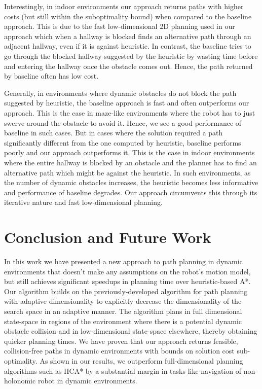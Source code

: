 Interestingly, in indoor environments our approach returns paths with higher costs (but still within the suboptimality bound) when compared to the baseline approach. This is due to the fast low-dimensional 2D planning used in our approach which when a hallway is blocked finds an alternative path through an adjacent hallway, even if it is against heuristic. In contrast, the baseline tries to go through the blocked hallway suggested by the heuristic by wasting time before and entering the hallway once the obstacle comes out. Hence, the path returned by baseline often has low cost.

Generally, in environments where dynamic obstacles do not block the path suggested by heuristic, the baseline approach is fast and often outperforms our approach. This is the case in maze-like environments where the robot has to just swerve around the obstacle to avoid it. Hence, we see a good performance of baseline in such cases. But in cases where the solution required a path significantly different from the one computed by heuristic, baseline performs poorly and our approach outperforms it. This is the case in indoor environments where the entire hallway is blocked by an obstacle and the planner has to find an alternative path which might be against the heuristic. In such environments, as the number of dynamic obstacles increases, the heuristic becomes less informative and performance of baseline degrades. Our approach circumvents this through its iterative nature and fast low-dimensional planning.

\section{Conclusion and Future Work}\label{sec:conclusion}

In this work we have presented a new approach to path planning in dynamic environments that doesn't make any assumptions on the robot's motion model, but still achieves significant speedups in planning time over heuristic-based A*.
Our algorithm builds on the previously-developed algorithm for path planning with adaptive dimensionality to explicitly decrease the dimensionality of the search space in an adaptive manner.
The algorithm plans in full dimensional state-space in regions of the environment where there is a potential dynamic obstacle collision and in low-dimensional state-space elsewhere, thereby obtaining quicker planning times.
 We have proven that our approach returns feasible, collision-free paths in dynamic environments with bounds on solution cost sub-optimality. As shown in our results, we outperform full-dimensional planning algorithms such as HCA* by a substantial margin in tasks like navigation of non-holonomic robot in dynamic environments. 


